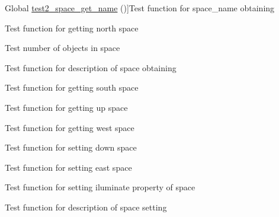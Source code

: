 \begin{DoxyRefList}
Global \hyperlink{space__test_8c_aee88ed31c63efc674051a4563aed86e2}{test2\+\_\+space\+\_\+get\+\_\+name} ()]Test function for space\+\_\+name obtaining  
\item[\label{test__test000152}%
\hypertarget{test__test000152}{}%
Global \hyperlink{space__test_8c_a61891c9cebb9d26dc9f149ad8341517c}{test2\+\_\+space\+\_\+get\+\_\+north} ()]Test function for getting north space  
\item[\label{test__test000128}%
\hypertarget{test__test000128}{}%
Global \hyperlink{space__test_8c_a77ab44cb3b3511ecdda66c13718d9048}{test2\+\_\+space\+\_\+get\+\_\+object\+\_\+number} ()]Test number of objects in space  
\item[\label{test__test000139}%
\hypertarget{test__test000139}{}%
Global \hyperlink{space__test_8c_a67b5e5c2289fb036c25e3618e2658954}{test2\+\_\+space\+\_\+get\+\_\+short\+\_\+description} ()]Test function for description of space obtaining  
\item[\label{test__test000157}%
\hypertarget{test__test000157}{}%
Global \hyperlink{space__test_8c_a40fe07c07c1069023b362a9e506c4c59}{test2\+\_\+space\+\_\+get\+\_\+south} ()]Test function for getting south space  
\item[\label{test__test000176}%
\hypertarget{test__test000176}{}%
Global \hyperlink{space__test_8c_a293a03e22f1bc96f193cc84abfd23fa4}{test2\+\_\+space\+\_\+get\+\_\+up} ()]Test function for getting up space  
\item[\label{test__test000167}%
\hypertarget{test__test000167}{}%
Global \hyperlink{space__test_8c_af1cf02b01c007aec0684186b39666c32}{test2\+\_\+space\+\_\+get\+\_\+west} ()]Test function for getting west space  
\item[\label{test__test000178}%
\hypertarget{test__test000178}{}%
Global \hyperlink{space__test_8c_a4d579ee19e22dfc43891f0dca5db14a6}{test2\+\_\+space\+\_\+set\+\_\+down} ()]Test function for setting down space  
\item[\label{test__test000159}%
\hypertarget{test__test000159}{}%
Global \hyperlink{space__test_8c_a5df66d103388be4518c379b224f53770}{test2\+\_\+space\+\_\+set\+\_\+east} ()]Test function for setting east space  
\item[\label{test__test000171}%
\hypertarget{test__test000171}{}%
Global \hyperlink{space__test_8c_a2576a23407d714fa26ce8f988a5df0e5}{test2\+\_\+space\+\_\+set\+\_\+iluminate} ()]Test function for setting iluminate property of space  
\item[\label{test__test000141}%
\hypertarget{test__test000141}{}%
Global \hyperlink{space__test_8c_a669293c8c232547b7bfc913e38856abd}{test2\+\_\+space\+\_\+set\+\_\+long\+\_\+description} ()]Test function for description of space setting  

\end{DoxyRefList}
